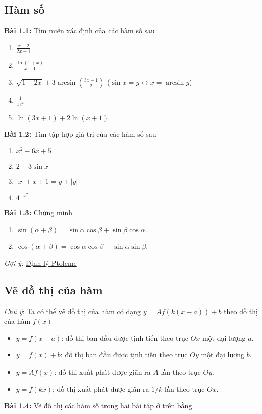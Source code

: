\subsection*{Hàm số}
\textbf{Bài 1.1:} Tìm miền xác định của các hàm số sau
\begin{enumerate}[label=(\alph*)]
\item \(\frac{x-2}{2x-1}\)
\item $\frac{\ln(1+x)}{x-1}$
\item $\sqrt{1-2x}+3\arcsin\left(\frac{3x-1}{2}\right)$ \quad ($\sin{x}=y\leftrightarrow x=\arcsin y$)
\item $\frac{1}{x e^x}$
\item $\ln{(3x+1)}+2\ln{(x+1)}$
\end{enumerate}

\vspace{5pt}
\textbf{Bài 1.2:} Tìm tập hợp giá trị của các hàm số sau
\begin{enumerate}[label=(\alph*)]
\item $x^2 -6x+5$
\item $2+3\sin x$
\item $|x| + x + 1 = y + |y|$
\item $4^{-x^2}$
\end{enumerate}
\vspace{5pt}

\textbf{Bài 1.3:} Chứng minh
\begin{enumerate}[label=(\alph*)]
\item $\sin(\alpha+\beta)=\sin\alpha\cos\beta + \sin\beta\cos\alpha.$
\item $\cos(\alpha+\beta)=\cos\alpha\cos\beta - \sin\alpha\sin\beta.$
\end{enumerate}

\emph{Gợi ý:} \href{https://vi.wikipedia.org/wiki/%C4%90%E1%BB%8Bnh_l%C3%BD_Ptoleme}{Định lý Ptoleme}

\subsection*{Vẽ đồ thị của hàm}
\emph{Chú ý}: Ta có thể vẽ đồ thị của hàm có dạng $y=Af(k(x-a))+b$ theo đồ thị của hàm $f(x)$
\begin{itemize}
    \item $y=f(x-a)$: đồ thị ban đầu được tịnh tiến theo trục $Ox$ một đại lượng $a$.
    \item $y=f(x)+b$: đồ thị ban đầu được tịnh tiến theo trục $Oy$ một đại lượng $b$.
    \item $y=Af(x)$: đồ thị xuất phát được giãn ra $A$ lần theo trục $Oy$.
    \item $y=f(kx)$: đồ thị xuất phát được giãn ra $1/k$ lần theo trục $Ox$.
\end{itemize}
\textbf{Bài 1.4:} Vẽ đồ thị các hàm số trong hai bài tập ở trên bằng

